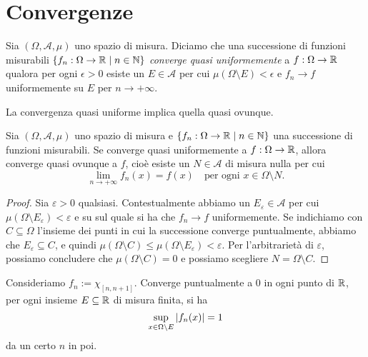 
\section{Convergenze}

\begin{definizione}
Sia \((\Omega, \mathcal A, \mu)\) uno spazio di misura. Diciamo che  una successione di funzioni misurabili \(\left\{f_n : \Omega \to \mathbb R \mid n \in \mathbb N\right\}\) {\em converge quasi uniformemente} a \(f : \Omega \to \mathbb R\) qualora per ogni \(\epsilon > 0\) esiste un \(E \in \mathcal A\) per cui \(\mu(\Omega \setminus E) < \epsilon\) e \(f_n \to f\) uniformemente su \(E\) per \(n \to +\infty\).
\end{definizione}

La convergenza quasi uniforme implica quella quasi ovunque.

\begin{proposizione}
Sia \((\Omega, \mathcal A, \mu)\) uno spazio di misura e \(\left\{f_n : \Omega \to \mathbb R \mid n \in \mathbb N\right\}\) una successione di funzioni misurabili. Se converge quasi uniformemente a \(f : \Omega \to \mathbb R\), allora converge quasi ovunque a \(f\), cioè esiste un \(N \in \mathcal A\) di misura nulla per cui
\[\lim_{n \to +\infty} f_n(x) = f(x) \quad \text{per ogni } x \in \Omega \setminus N .\] 
\end{proposizione}

\begin{proof}
Sia \(\varepsilon > 0\) qualsiasi. Contestualmente abbiamo un \(E_\varepsilon \in \mathcal A\) per cui \(\mu(\Omega \setminus E_\varepsilon) < \varepsilon\) e su sul quale si ha che \(f_n \to f\) uniformemente. Se indichiamo con \(C \subseteq \Omega\) l'insieme dei punti in cui la successione converge puntualmente, abbiamo che \(E_\varepsilon \subseteq C\), e quindi \(\mu(\Omega \setminus C) \le \mu(\Omega \setminus E_\varepsilon) < \varepsilon\). Per l'arbitrarietà di \(\varepsilon\), possiamo concludere che \(\mu(\Omega \setminus C) = 0\) e possiamo scegliere \(N = \Omega \setminus C\).  
\end{proof}

\begin{esempio}
Consideriamo \(f_n := \chi_{[n, n+1]}\). Converge puntualmente a \(0\) in ogni punto di \(\mathbb R\), per ogni insieme \(E \subseteq \mathbb R\) di misura finita, si ha
\[\sup_{x \in \Omega \setminus E} \left\lvert f_n(x)\right\rvert = 1\]
da un certo \(n\) in poi.
\end{esempio} 

